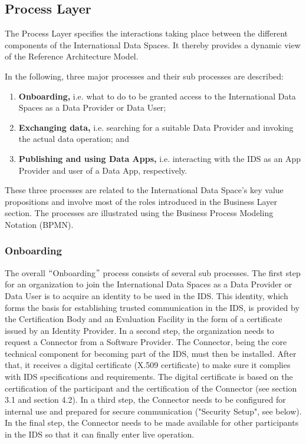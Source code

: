 
\subsection{Process Layer}\label{subsec:process_layer}
The Process Layer specifies the interactions taking place between the different components of the International Data Spaces. It thereby provides a dynamic view of the Reference Architecture Model. 

In the following, three major processes and their sub processes are described:



\begin{enumerate}
	\item \textbf{Onboarding,}  i.e. what to do to be granted access to the International Data Spaces as a Data Provider or Data User;

	\item \textbf{Exchanging data,} i.e. searching for a suitable Data Provider and invoking the actual data operation; and

	\item \textbf{Publishing and using Data Apps, }i.e. interacting with the IDS as an App Provider and user of a Data App, respectively.

\end{enumerate}\par



These three processes are related to the International Data Space's key value propositions and involve most of the roles introduced in the Business Layer section. The processes are illustrated using the Business Process Modeling Notation (BPMN).


\subsubsection{Onboarding}
The overall $``$Onboarding$"$  process consists of several sub processes. The first step for an organization to join the International Data Spaces as a Data Provider or Data User is to acquire an identity to be used in the IDS. This identity, which forms the basis for establishing trusted communication in the IDS, is provided by the Certification Body and an Evaluation Facility in the form of a certificate issued by an Identity Provider. In a second step, the organization needs to request a Connector from a Software Provider. The Connector, being the core technical component for becoming part of the IDS, must then be installed. After that, it receives a digital certificate (X.509 certificate) to make sure it complies with IDS specifications and requirements. The digital certificate is based on the certification of the participant and the certification of the Connector (see section 3.1 and section 4.2).  In a third step, the Connector needs to be configured for internal use and prepared for secure communication ("Security Setup", see below). In the final step, the Connector needs to be made available for other participants in the IDS so that it can finally enter live operation. 

